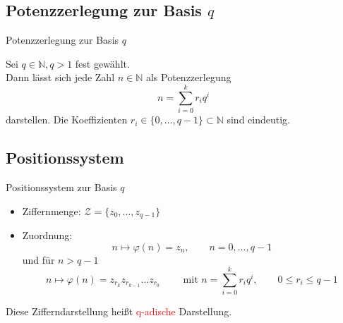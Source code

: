 \documentclass[12pt%
,aspectratio=169%
]{beamer}
\begin{document}
\subsection{Potenzzerlegung zur Basis $q$}
\begin{frame}{Potenzzerlegung zur Basis $q$}
\begin{theorem}
Sei $q \in \mathbb{N}, q > 1$ fest gewählt.\\
Dann lässt sich jede Zahl $n \in \mathbb{N}$ als Potenzzerlegung
$$
	n = \sum_{i=0}^k r_i q^i
$$
darstellen.
Die Koeffizienten $r_i \in \{0, \ldots, q-1\} \subset \mathbb{N}$ sind eindeutig.
\end{theorem}
\end{frame}

\subsection{Positionssystem}
\begin{frame}{Positionssystem zur Basis $q$}
\begin{definition}
\begin{itemize}
	\item Ziffernmenge: $\mathcal{Z} = \{z_0 , \ldots , z_{q-1}\}$
	\item Zuordnung:
	$$
		n \mapsto \varphi(n) = z_n, \qquad n = 0, \ldots, q-1
	$$
	und für $n > q-1$
	$$
		n \mapsto \varphi(n) = z_{r_{k}} z_{r_{k-1}} \ldots z_{r_{0}} \qquad \text{ mit } n = \sum_{i=0}^k r_i q^i , \qquad 0 \leq r_i \leq q-1
	$$
\end{itemize}
Diese Zifferndarstellung heißt \textcolor{red}{q-adische} Darstellung.
\end{definition}
\end{frame}
\end{document}
